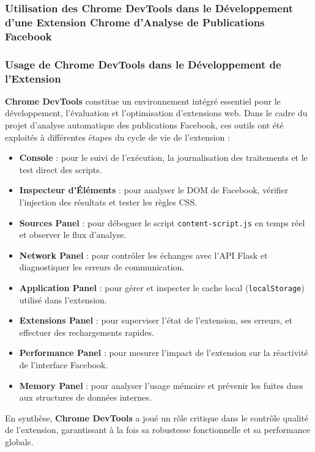 \subsubsection{Utilisation des Chrome DevTools dans le Développement d'une Extension Chrome d'Analyse de Publications Facebook}
\vspace{0.3cm}
\subsubsection*{ Usage de Chrome DevTools dans le Développement de l'Extension}

\begin{specialpar}
\textbf{Chrome DevTools} constitue un environnement intégré essentiel pour le développement, l’évaluation et l’optimisation d’extensions web. Dans le cadre du projet d’analyse automatique des publications Facebook, ces outils ont été exploités à différentes étapes du cycle de vie de l’extension :
\end{specialpar}

\begin{itemize}
  \item \textbf{Console} : pour le suivi de l’exécution, la journalisation des traitements et le test direct des scripts.
  \item \textbf{Inspecteur d’Éléments} : pour analyser le DOM de Facebook, vérifier l’injection des résultats et tester les règles CSS.
  \item \textbf{Sources Panel} : pour déboguer le script \texttt{content-script.js} en temps réel et observer le flux d’analyse.
  \item \textbf{Network Panel} : pour contrôler les échanges avec l’API Flask et diagnostiquer les erreurs de communication.
  \item \textbf{Application Panel} : pour gérer et inspecter le cache local (\texttt{localStorage}) utilisé dans l’extension.
  \item \textbf{Extensions Panel} : pour superviser l’état de l’extension, ses erreurs, et effectuer des rechargements rapides.
  \item \textbf{Performance Panel} : pour mesurer l’impact de l’extension sur la réactivité de l’interface Facebook.
  \item \textbf{Memory Panel} : pour analyser l’usage mémoire et prévenir les fuites dues aux structures de données internes.
\end{itemize}

\begin{specialpar}
En synthèse, \textbf{Chrome DevTools} a joué un rôle critique dans le contrôle qualité de l’extension, garantissant à la fois sa robustesse fonctionnelle et sa performance globale.
\end{specialpar}


